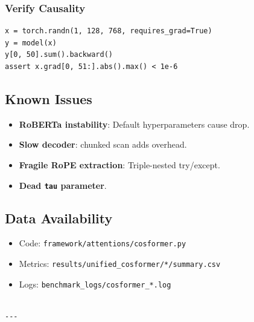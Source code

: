 \subsubsection{Verify Causality}

\begin{lstlisting}
x = torch.randn(1, 128, 768, requires_grad=True)
y = model(x)
y[0, 50].sum().backward()
assert x.grad[0, 51:].abs().max() < 1e-6
\end{lstlisting}

\subsection{Known Issues}

\begin{itemize}
\item \textbf{RoBERTa instability}: Default hyperparameters cause drop.
\item \textbf{Slow decoder}: chunked scan adds overhead.
\item \textbf{Fragile RoPE extraction}: Triple-nested try/except.
\item \textbf{Dead \texttt{tau} parameter}.

\end{itemize}
\subsection{Data Availability}

\begin{itemize}
\item Code: \texttt{framework/attentions/cosformer.py}
\item Metrics: \texttt{results/unified\_cosformer/*/summary.csv}
\item Logs: \texttt{benchmark\_logs/cosformer\_*.log}
\end{itemize}
\begin{lstlisting}

---
\end{lstlisting}